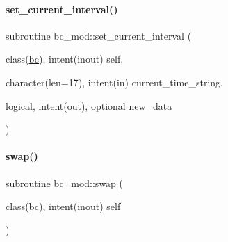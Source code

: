 \mbox{\label{namespacebc__mod_a54709c03d02b3a537c61ef98ce464ac6}} 
\paragraph{\texorpdfstring{set\+\_\+current\+\_\+interval()}{set\_current\_interval()}}
{\footnotesize\ttfamily subroutine bc\+\_\+mod\+::set\+\_\+current\+\_\+interval (\begin{DoxyParamCaption}\item[{class(\mbox{\hyperlink{structbc__mod_1_1bc}{bc}}), intent(inout)}]{self,  }\item[{character(len=17), intent(in)}]{current\+\_\+time\+\_\+string,  }\item[{logical, intent(out), optional}]{new\+\_\+data }\end{DoxyParamCaption})\hspace{0.3cm}{\ttfamily [private]}}

\mbox{\label{namespacebc__mod_a248045244b644d0fca3b061f2baf93a7}} 
\paragraph{\texorpdfstring{swap()}{swap()}}
{\footnotesize\ttfamily subroutine bc\+\_\+mod\+::swap (\begin{DoxyParamCaption}\item[{class(\mbox{\hyperlink{structbc__mod_1_1bc}{bc}}), intent(inout)}]{self }\end{DoxyParamCaption})\hspace{0.3cm}{\ttfamily [private]}}

